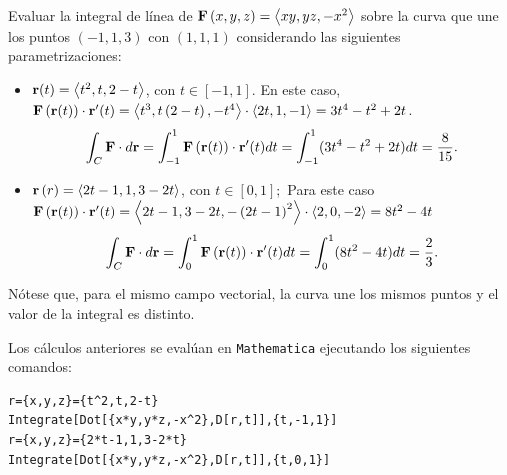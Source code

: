 \begin{ejemplo} \label{integraldelinea}
  Evaluar la integral de línea de ${\bf F}\left( x,y,z\right) =\left\langle xy,yz,-x^{2}\right\rangle $ sobre la curva que une los puntos $\left(-1,1,3\right) $ con
  $\left( 1,1,1\right)$ considerando las siguientes parametrizaciones:

  \begin{itemize}
    \item ${\bf r}(t) =\left\langle t^{2},t,2-t\right\rangle $, con $t\in[-1,1]$. En este caso,\\ ${\bf F}\left({\bf r}(t) \right) \cdot {\bf r}^{\prime }(t)= \left\langle t^{3},t\left( 2-t\right) ,-t^{4}\right\rangle \cdot \left\langle 2t,1,-1\right\rangle = 3t^{4}-t^{2}+2t$.
      \begin{gather*}
        \int_{C}{\bf F}\cdot d{\bf r} =\int_{-1}^{1}{\bf F}\left({\bf r}(t) \right) \cdot {\bf r}^{\prime }(t) dt
        = \int_{-1}^{1}(3t^{4}-t^{2}+2t) dt= \frac{8}{15}.
      \end{gather*}

    \item ${\bf r}\left( r\right) =\left\langle 2t-1,1,3-2t\right\rangle $, con $t\in [0,1];$ Para este caso ${\bf F}\left({\bf r}(t) \right) \cdot {\bf r}^{\prime }(t)= \left\langle 2t-1,3-2t,-\left( 2t-1\right) ^{2}\right\rangle \cdot \left\langle 2,0,-2\right\rangle = 8t^{2}-4t$
      \begin{gather*}
        \int_{C}{\bf F}\cdot d{\bf r}=\int_{0}^{1}{\bf F}\left({\bf r}(t) \right) \cdot {\bf r}^{\prime }(t) dt = \int_{0}^{1} (8t^{2}-4t) dt = \frac{2}{3}.
      \end{gather*}
  \end{itemize}
  Nótese que, para el mismo campo vectorial, la curva une los mismos puntos y el valor de la integral es distinto.
\end{ejemplo}

Los cálculos anteriores se evalúan en \verb"Mathematica" ejecutando los siguien\-tes comandos:

\begin{tcolorbox}[title=\bf Instrucción \verb"Mathematica"]\begin{Verbatim}[formatcom=\letraverbatim]
r={x,y,z}={t^2,t,2-t}
Integrate[Dot[{x*y,y*z,-x^2},D[r,t]],{t,-1,1}]
r={x,y,z}={2*t-1,1,3-2*t}
Integrate[Dot[{x*y,y*z,-x^2},D[r,t]],{t,0,1}]
\end{Verbatim}
\end{tcolorbox}

